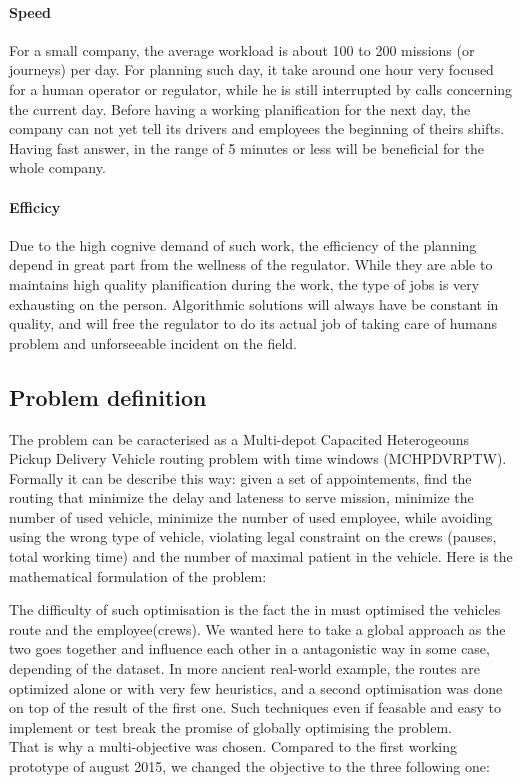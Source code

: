 \documentclass[12pt]{memoir}
\begin{document}
\paragraph{Speed} %
\label{par:Speed}
For a small company, the average workload is about 100 to 200 missions (or journeys)
per day. For planning such day, it take around one hour very focused for a human
operator or regulator, while he is still interrupted by calls concerning the current
day. Before having a working planification for the next day, the company can not yet
tell its drivers and employees the beginning of theirs shifts. Having fast answer,
in the range of 5 minutes or less will be beneficial for the whole company.
\paragraph{Efficicy} %
\label{par:Efficicy}
Due to the high cognive demand of such work, the efficiency of the planning depend
in great part from the wellness of the regulator. While they are able to maintains
high quality planification during the work, the type of jobs is very exhausting on
the person. Algorithmic solutions will always have be constant in quality, and will
free the regulator to do its actual job of taking care of humans problem and
unforseeable incident on the field.


\subsection{Problem definition}
The problem can be caracterised as a Multi-depot Capacited Heterogeouns Pickup
Delivery Vehicle routing problem with time windows (MCHPDVRPTW). \\
Formally it can be describe this way: given a set of appointements, find the routing that minimize the
delay and lateness to serve mission, minimize the number of used vehicle, minimize
the number of used employee, while avoiding using the wrong type of vehicle,
violating legal constraint on the crews (pauses, total working time) and the number
of maximal patient in the vehicle.
Here is the mathematical formulation of the problem:
%
%

The difficulty of such optimisation is the fact the in must optimised the vehicles
route and the employee(crews). We wanted here to take a global approach as the two
goes together and influence each other in a antagonistic way in some case, depending
of the dataset. In more ancient real-world example, the routes are optimized alone
or with very few heuristics, and a second optimisation was done on top of the result
of the first one. Such techniques even if feasable and easy to implement or test
break the promise of globally optimising the problem.\\
That is  why a multi-objective was chosen. Compared to the first working prototype
of august 2015, we changed the objective to the three following one:
\end{document}
